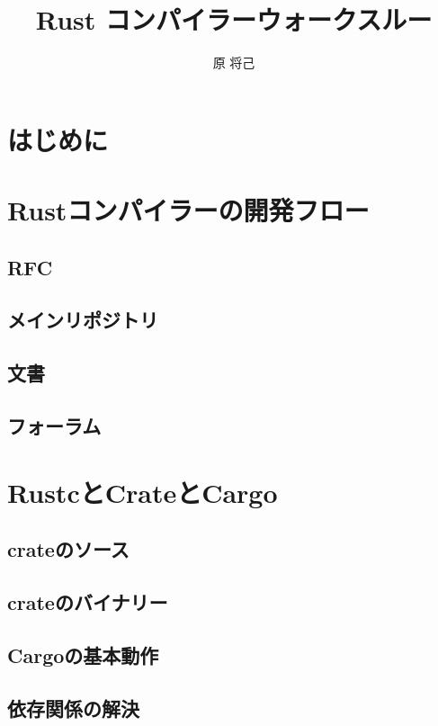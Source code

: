 \documentclass[dvipdfmx,uplatex,papersize,a4paper,10pt]{jsbook}
\title{Rust コンパイラーウォークスルー}
\author{原 将己}
\theoremstyle{definition}
\begin{document}
\maketitle

\tableofcontents

\chapter{はじめに}



\chapter{Rustコンパイラーの開発フロー}

\section{RFC}

\section{メインリポジトリ}

\section{文書}

\section{フォーラム}


\chapter{RustcとCrateとCargo}

\section{crateのソース}

\section{crateのバイナリー}

\section{Cargoの基本動作}

\section{依存関係の解決}
\end{document}
